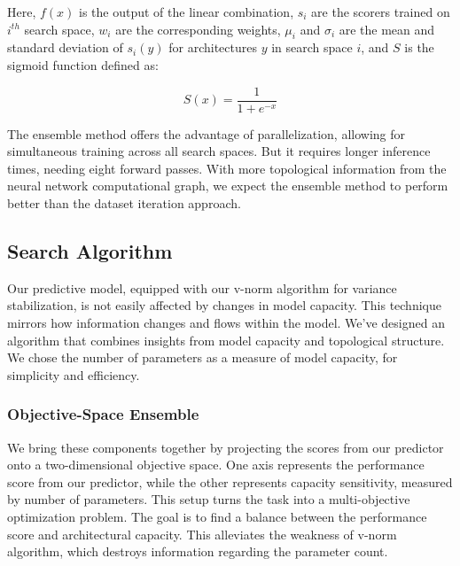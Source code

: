 \documentclass[lettersize,journal]{IEEEtran}
\begin{document}
            Here, $f(x)$ is the output of the linear combination, $s_i$ are the scorers trained on $i^{th}$ search space, $w_i$ are the corresponding weights, $\mu_i$ and $\sigma_i$ are the mean and standard deviation of $s_i(y)$ for architectures $y$ in search space $i$, and $S$ is the sigmoid function defined as:
            
            \begin{equation}
            S(x) = \frac{1}{1 + e^{-x}}
            \end{equation}
            
            The ensemble method offers the advantage of parallelization, allowing for simultaneous training across all search spaces. But it requires longer inference times, needing eight forward passes. With more topological information from the neural network computational graph, we expect the ensemble method to perform better than the dataset iteration approach.
        


    \subsection{Search Algorithm} \label{sec:searchalgo}
        Our predictive model, equipped with our v-norm algorithm for variance stabilization, is not easily affected by changes in model capacity. This technique mirrors how information changes and flows within the model. We've designed an algorithm that combines insights from model capacity and topological structure. We chose the number of parameters as a measure of model capacity, for simplicity and efficiency.
        
        \subsubsection{Objective-Space Ensemble}
            We bring these components together by projecting the scores from our predictor onto a two-dimensional objective space. One axis represents the performance score from our predictor, while the other represents capacity sensitivity, measured by number of parameters. This setup turns the task into a multi-objective optimization problem. The goal is to find a balance between the performance score and architectural capacity. This alleviates the weakness of v-norm algorithm, which destroys information regarding the parameter count.
        
\end{document}
